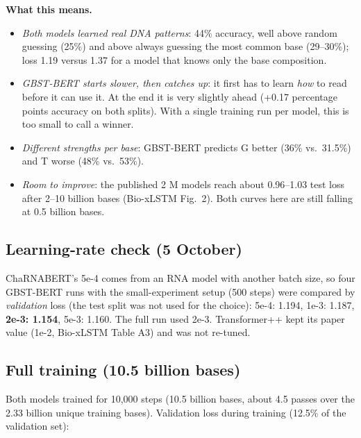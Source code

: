 \documentclass[11pt,a4paper]{article}
\begin{document}
\textbf{What this means.}
\begin{itemize}
\item \emph{Both models learned real DNA patterns}: 44\% accuracy, well above random guessing
  (25\%) and above always guessing the most common base (29--30\%); loss 1.19 versus 1.37 for a
  model that knows only the base composition.
\item \emph{GBST-BERT starts slower, then catches up}: it first has to learn \emph{how} to read
  before it can use it. At the end it is very slightly ahead (+0.17 percentage points accuracy on
  both splits). With a single training run per model, this is too small to call a winner.
\item \emph{Different strengths per base}: GBST-BERT predicts G better (36\% vs.\ 31.5\%) and T
  worse (48\% vs.\ 53\%).
\item \emph{Room to improve}: the published 2 M models reach about 0.96--1.03 test loss after
  2--10 billion bases (Bio-xLSTM Fig.~2). Both curves here are still falling at 0.5 billion bases.
\end{itemize}

\subsection*{Learning-rate check (5 October)}
ChaRNABERT's 5e-4 comes from an RNA model with another batch size, so four GBST-BERT runs with the
small-experiment setup (500 steps) were compared by \emph{validation} loss (the test split was not
used for the choice): 5e-4: 1.194, 1e-3: 1.187, \textbf{2e-3: 1.154}, 5e-3: 1.160. The full run
used 2e-3. Transformer++ kept its paper value (1e-2, Bio-xLSTM Table A3) and was not re-tuned.

\subsection*{Full training (10.5 billion bases)}
Both models trained for 10,000 steps (10.5 billion bases, about 4.5 passes over the 2.33 billion
unique training bases). Validation loss during training (12.5\% of the validation set):
\end{document}
